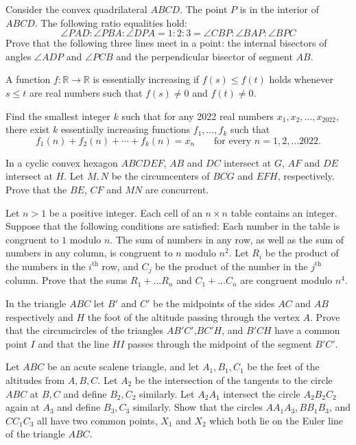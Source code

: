 \documentclass[11pt]{scrartcl}
\begin{document}
\begin{problem}[915478364939250]
Consider the convex quadrilateral $ABCD$. The point $P$ is in the interior of $ABCD$. The following ratio equalities hold:
\[\angle PAD:\angle PBA:\angle DPA=1:2:3=\angle CBP:\angle BAP:\angle BPC\]Prove that the following three lines meet in a point: the internal bisectors of angles $\angle ADP$ and $\angle PCB$ and the perpendicular bisector of segment $AB$.
\end{problem}
\begin{problem}[8892145789808454835]
A function $f: \mathbb{R}\to \mathbb{R}$ is essentially increasing if $f(s)\leq f(t)$ holds whenever $s\leq t$ are real numbers such that $f(s)\neq 0$ and $f(t)\neq 0$.

Find the smallest integer $k$ such that for any 2022 real numbers $x_1,x_2,\ldots , x_{2022},$ there exist $k$ essentially increasing functions $f_1,\ldots, f_k$ such that\[f_1(n) + f_2(n) + \cdots + f_k(n) = x_n\qquad \text{for every } n= 1,2,\ldots 2022.\]
\end{problem}
\begin{problem}[409530198849693]
In a cyclic convex hexagon $ABCDEF$, $AB$ and $DC$ intersect at $G$, $AF$ and $DE$ intersect at $H$. Let $M, N$ be the circumcenters of $BCG$ and $EFH$, respectively. Prove that the $BE$, $CF$ and $MN$ are concurrent.
\end{problem}
\begin{problem}[1248852037865425410]
Let $n>1$ be a positive integer. Each cell of an $n\times n$ table contains an integer. Suppose that the following conditions are satisfied:
Each number in the table is congruent to $1$ modulo $n$.
The sum of numbers in any row, as well as the sum of numbers in any column, is congruent to $n$ modulo $n^2$.
Let $R_i$ be the product of the numbers in the $i^{\text{th}}$ row, and $C_j$ be the product of the number in the $j^{\text{th}}$ column. Prove that the sums $R_1+\hdots R_n$ and $C_1+\hdots C_n$ are congruent modulo $n^4$.
\end{problem}
\begin{problem}[7243491713649826569]
In the triangle $ABC$ let $B'$ and $C'$ be the midpoints of the sides $AC$ and $AB$ respectively and $H$ the foot of the altitude passing through the vertex $A$. Prove that the circumcircles of the triangles $AB'C'$,$BC'H$, and $B'CH$ have a common point $I$ and that the line $HI$ passes through the midpoint of the segment $B'C'.$
\end{problem}
\begin{problem}[8330669807899443473]
Let $ABC$ be an acute scalene triangle, and let $A_1, B_1, C_1$ be the feet of the altitudes from $A, B, C$. Let $A_2$ be the intersection of the tangents to the circle $ABC$ at $B, C$ and define $B_2, C_2$ similarly. Let $A_2A_1$ intersect the circle $A_2B_2C_2$ again at $A_3$ and define $B_3, C_3$ similarly. Show that the circles $AA_1A_3, BB_1B_3$, and $CC_1C_3$ all have two common points, $X_1$ and $X_2$ which both lie on the Euler line of the triangle $ABC$.
\end{problem}
\end{document}
